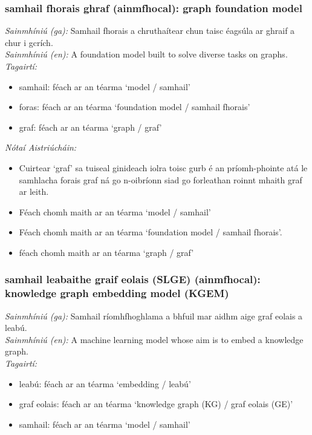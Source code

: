 \subsubsection*{samhail fhorais ghraf (ainmfhocal): graph foundation model}
 \noindent \textit{Sainmhíniú (ga):} Samhail fhorais a chruthaítear chun taisc éagsúla ar ghraif a chur i gcrích.
\\
 \noindent \textit{Sainmhíniú (en):} A foundation model built to solve diverse tasks on graphs.
\\
 \noindent \textit{Tagairtí:}
\begin{itemize}
	\item samhail: féach ar an téarma `model / samhail'
	\item foras: féach ar an téarma `foundation model / samhail fhorais'
	\item graf: féach ar an téarma `graph / graf'
\end{itemize}

 \noindent \textit{Nótaí Aistriúcháin:}
\begin{itemize}
	\item Cuirtear `graf' sa tuiseal ginideach iolra toisc gurb é an príomh-phointe atá le samhlacha forais graf ná go n-oibríonn siad go forleathan roinnt mhaith graf ar leith.
	\item Féach chomh maith ar an téarma `model / samhail'
	\item Féach chomh maith ar an téarma `foundation model / samhail fhorais'.
	\item féach chomh maith ar an téarma `graph / graf'
\end{itemize}


\subsubsection*{samhail leabaithe graif eolais (SLGE) (ainmfhocal): knowledge graph embedding model (KGEM)}
 \noindent \textit{Sainmhíniú (ga):} Samhail ríomhfhoghlama a bhfuil mar aidhm aige graf eolais a leabú.
\\
 \noindent \textit{Sainmhíniú (en):} A machine learning model whose aim is to embed a knowledge graph.
\\
 \noindent \textit{Tagairtí:}
\begin{itemize}
	\item leabú: féach ar an téarma `embedding / leabú'
	\item graf eolais: féach ar an téarma `knowledge graph (KG) / graf eolais (GE)'
	\item samhail: féach ar an téarma `model / samhail'
\end{itemize}

